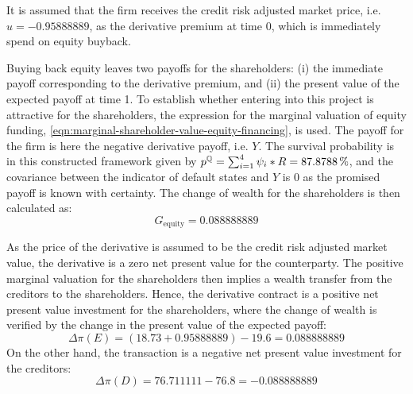 \documentclass[main.tex]{subfiles}
\begin{document}
            It is assumed that the firm receives the credit risk adjusted market price,
            i.e. $u=\num{-0.95888889}$, as the derivative premium at time 0, which is immediately spend on equity buyback.

            Buying back equity leaves two payoffs for the shareholders:
            (i) the immediate payoff corresponding to the derivative premium, and
            (ii) the present value of the expected payoff at time 1.
            To establish whether entering into this project is attractive for the shareholders,
            the expression for the marginal valuation of equity funding, \cref{eqn:marginal-shareholder-value-equity-financing}, is used.
            The payoff for the firm is here the negative derivative payoff, i.e. $Y$.
            The survival probability is in this constructed framework given by $p^{\rnmeasure} = \sum_{i=1}^{4} \psi_{i} * \grossrfrate = \pct{0.878788}$, and the covariance between the indicator of default states and $Y$ is 0 as the promised payoff is known with certainty.
            The change of wealth for the shareholders is then calculated as:
            \begin{equation}
                G_{\text{equity}} = \num{0.088888889}
            \end{equation}
            
            As the price of the derivative is assumed to be the credit risk adjusted market value,
            the derivative is a zero net present value for the counterparty.
            The positive marginal valuation for the shareholders then implies a wealth transfer from the creditors to the shareholders.
            Hence, the derivative contract is a positive net present value investment for the shareholders, 
            where the change of wealth is verified by the change in the present value of the expected payoff:
            \begin{equation}
                \Delta \pi(E) = (\num{18.73} + \num{0.95888889}) - \num{19.6} = \num{0.088888889}
            \end{equation}
            On the other hand, the transaction is a negative net present value investment for the creditors:
            \begin{equation}
                \Delta \pi(D) = \num{76.711111} - \num{76.8} = \num{-0.088888889}
            \end{equation}
\end{document}
